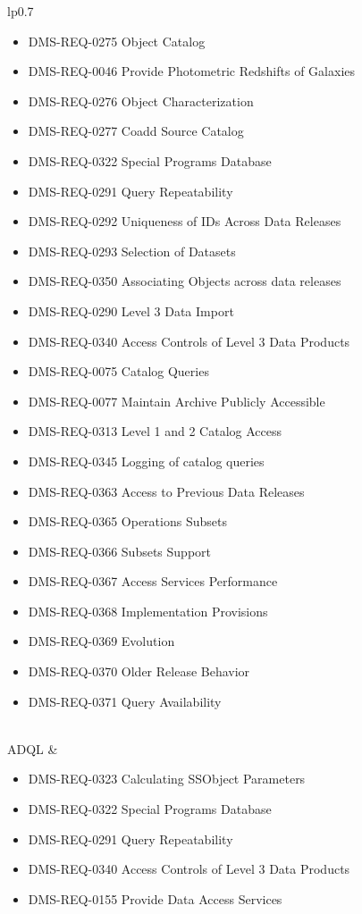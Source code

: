 \begin{xtabular}{lp{0.7\textwidth}}
\begin{itemize}
\item DMS-REQ-0275 Object Catalog
\item DMS-REQ-0046 Provide Photometric Redshifts of Galaxies
\item DMS-REQ-0276 Object Characterization
\item DMS-REQ-0277 Coadd Source Catalog
\item DMS-REQ-0322 Special Programs Database
\item DMS-REQ-0291 Query Repeatability
\item DMS-REQ-0292 Uniqueness of IDs Across Data Releases
\item DMS-REQ-0293 Selection of Datasets
\item DMS-REQ-0350 Associating Objects across data releases
\item DMS-REQ-0290 Level 3 Data Import
\item DMS-REQ-0340 Access Controls of Level 3 Data Products
\item DMS-REQ-0075 Catalog Queries
\item DMS-REQ-0077 Maintain Archive Publicly Accessible
\item DMS-REQ-0313 Level 1 and 2 Catalog Access
\item DMS-REQ-0345 Logging of catalog queries
\item DMS-REQ-0363 Access to Previous Data Releases
\item DMS-REQ-0365 Operations Subsets
\item DMS-REQ-0366 Subsets Support
\item DMS-REQ-0367 Access Services Performance
\item DMS-REQ-0368 Implementation Provisions
\item DMS-REQ-0369 Evolution
\item DMS-REQ-0370 Older Release Behavior
\item DMS-REQ-0371 Query Availability
\end{itemize} \\ \hline
ADQL &
\begin{itemize}DMS-REQ-0331 Computing Derived Quantities
\item DMS-REQ-0323 Calculating SSObject Parameters
\item DMS-REQ-0322 Special Programs Database
\item DMS-REQ-0291 Query Repeatability
\item DMS-REQ-0340 Access Controls of Level 3 Data Products
\item DMS-REQ-0155 Provide Data Access Services

\end{itemize}
\end{xtabular}
